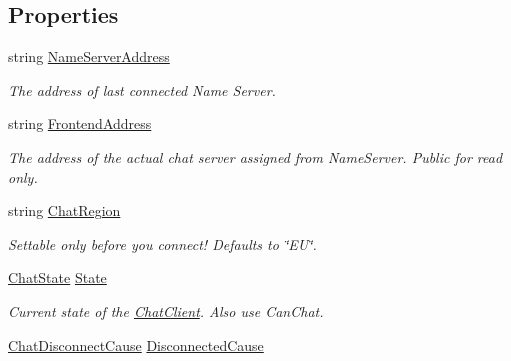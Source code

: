 \subsection*{Properties}
\begin{DoxyCompactItemize}
\item 
string \hyperlink{class_exit_games_1_1_client_1_1_photon_1_1_chat_1_1_chat_client_afc6baf1a806a9a9ea803b14889ffb8c3}{Name\+Server\+Address}
\begin{DoxyCompactList}\small\item\em The address of last connected Name Server.\end{DoxyCompactList}\item 
string \hyperlink{class_exit_games_1_1_client_1_1_photon_1_1_chat_1_1_chat_client_a4693102ef8b77518b9eed0cbbdd650e1}{Frontend\+Address}
\begin{DoxyCompactList}\small\item\em The address of the actual chat server assigned from Name\+Server. Public for read only.\end{DoxyCompactList}\item 
string \hyperlink{class_exit_games_1_1_client_1_1_photon_1_1_chat_1_1_chat_client_a5b8e2b595533f33e5c298fe5ced2726b}{Chat\+Region}
\begin{DoxyCompactList}\small\item\em Settable only before you connect! Defaults to \char`\"{}\+E\+U\char`\"{}.\end{DoxyCompactList}\item 
\hyperlink{namespace_exit_games_1_1_client_1_1_photon_1_1_chat_ad7d7f22d8741237f41e4b60779cdfa19}{Chat\+State} \hyperlink{class_exit_games_1_1_client_1_1_photon_1_1_chat_1_1_chat_client_a5d523809d52088df6fbd8927523d6238}{State}
\begin{DoxyCompactList}\small\item\em Current state of the \hyperlink{class_exit_games_1_1_client_1_1_photon_1_1_chat_1_1_chat_client}{Chat\+Client}. Also use Can\+Chat.\end{DoxyCompactList}\item 
\hyperlink{namespace_exit_games_1_1_client_1_1_photon_1_1_chat_ae3a2988c8cb1fea31bb2d9eeafc0ed8b}{Chat\+Disconnect\+Cause} \hyperlink{class_exit_games_1_1_client_1_1_photon_1_1_chat_1_1_chat_client_a05085dc638466b2660f1c694f90fbf8e}{Disconnected\+Cause}

\end{DoxyCompactItemize}
